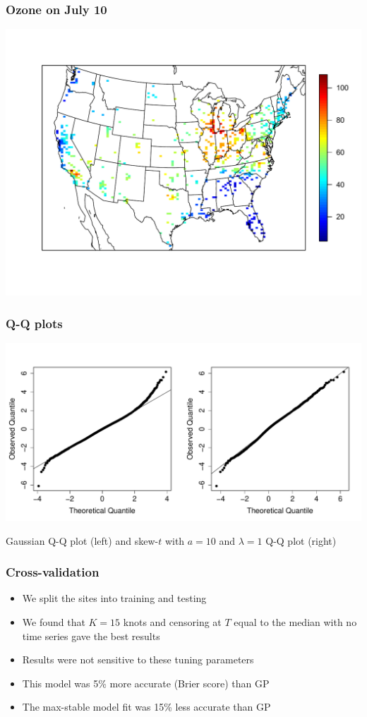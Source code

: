 \documentclass{beamer}
\begin{document}
 \begin{frame}\frametitle{Ozone on July 10}
 	\begin{center}
 		\includegraphics[width=1.2\textheight]{ozone-10jul-us}
 	\end{center}
 \end{frame}

 \begin{frame}\frametitle{Q-Q plots}
 	\begin{center}
 		\includegraphics[width=0.9\textheight]{qq-res}

 		Gaussian Q-Q plot (left) and skew-$t$ with $a = 10$ and $\lambda = 1$ Q-Q plot (right)
 	\end{center}
 \end{frame}

 \begin{frame}\frametitle{Cross-validation}
 	\begin{itemize}\setlength\itemsep{\fill}
 	\item We split the sites into training and testing
 	\item We found that $K=15$ knots and censoring at $T$ equal to the median with no time series gave the best results
 	\item Results were not sensitive to these tuning parameters
 	\item This model was 5\% more accurate (Brier score) than GP
 	\item The max-stable model fit was 15\% less accurate than GP
 	\end{itemize}
 \end{frame}
\end{document}
